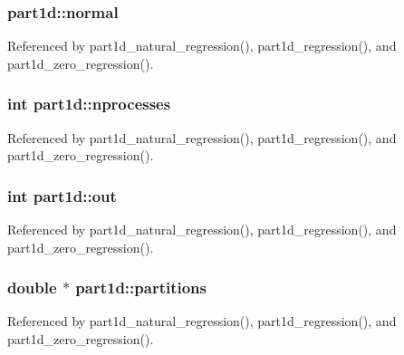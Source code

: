 \subsubsection[{\texorpdfstring{normal}{normal}}]{ part1d\+::normal}\hypertarget{structpart1d_a729c1fa7fcda6bb018df1c9ab908be7c}{}\label{structpart1d_a729c1fa7fcda6bb018df1c9ab908be7c}


Referenced by part1d\+\_\+natural\+\_\+regression(), part1d\+\_\+regression(), and part1d\+\_\+zero\+\_\+regression().

\subsubsection[{\texorpdfstring{nprocesses}{nprocesses}}]{\setlength{\rightskip}{0pt plus 5cm}int part1d\+::nprocesses}\hypertarget{structpart1d_a719eca19acb2bb75a4beb07fee91802a}{}\label{structpart1d_a719eca19acb2bb75a4beb07fee91802a}


Referenced by part1d\+\_\+natural\+\_\+regression(), part1d\+\_\+regression(), and part1d\+\_\+zero\+\_\+regression().

\subsubsection[{\texorpdfstring{out}{out}}]{\setlength{\rightskip}{0pt plus 5cm}int part1d\+::out}\hypertarget{structpart1d_a675c73d131631df6c702fc72ffbd8f0e}{}\label{structpart1d_a675c73d131631df6c702fc72ffbd8f0e}


Referenced by part1d\+\_\+natural\+\_\+regression(), part1d\+\_\+regression(), and part1d\+\_\+zero\+\_\+regression().

\subsubsection[{\texorpdfstring{partitions}{partitions}}]{\setlength{\rightskip}{0pt plus 5cm}double $\ast$ part1d\+::partitions}\hypertarget{structpart1d_a4f6721b3b9fc5faa4dd6c19f30a52ace}{}\label{structpart1d_a4f6721b3b9fc5faa4dd6c19f30a52ace}


Referenced by part1d\+\_\+natural\+\_\+regression(), part1d\+\_\+regression(), and part1d\+\_\+zero\+\_\+regression().

